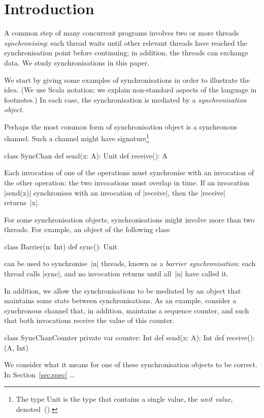
\section{Introduction}

A common step of many concurrent programs involves two or more threads
\emph{synchronising}: each thread waits until other relevant threads have
reached the synchronisation point before continuing; in addition, the threads
can exchange data.  We study synchronisations in this paper.

We start by giving some examples of synchronisations in order to illustrate
the idea.  (We use Scala notation; we explain non-standard aspects of the
language in footnotes.)  In each case, the synchronisation is mediated by a
\emph{synchronisation object}.

Perhaps the most common form of synchronisation object is a synchronous
channel.  Such a channel might have signature\footnote{The type {\scalashape
    Unit} is the type that contains a single value, the \emph{unit value},
  denoted~{\scalashape ()}.}
%
\begin{scala}
class SyncChan{
  def send(x: A): Unit
  def receive(): A
}
\end{scala}
%
Each invocation of one of the operations must synchronise with an invocation
of the other operation: the two invocations must overlap in time.  If an
invocation |send(x)| synchronises with an invocation of |receive|, then the
|receive| returns~|x|.

For some synchronisation objects, synchronisations might involve more than two
threads.  For example, an object of the following class
%
\begin{scala}
class Barrier(n: Int){
  def sync(): Unit
}
\end{scala}
%
can be used to synchronise~|n| threads, known as a \emph{barrier
  synchronisation}: each thread calls |sync|, and no invocation returns until
all~|n| have called it.

In addition, we allow the synchronisations to be mediated by an object that
maintains some state between synchronisations.  As an example, consider a
synchronous channel that, in addition, maintains a sequence counter, and such
that both invocations receive the value of this counter.
\begin{scala}
class SyncChanCounter{
  private var counter: Int
  def send(x: A): Int
  def receive(): (A, Int)
}
\end{scala}


We consider what it means for one of these synchronisation objects to be
correct.   In Section~\ref{sec:spec} \ldots

